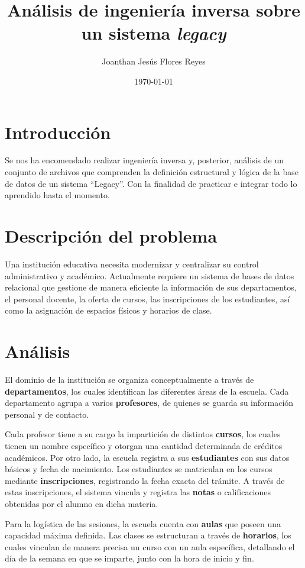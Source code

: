 \documentclass[12pt,letterpaper]{article}
\author{Joanthan Jesús Flores Reyes}
\title{Análisis de ingeniería inversa sobre un sistema \textit{legacy}}
\date{\today}
\begin{document}
\maketitle
\tableofcontents
\listoffigures
\listoftables
\lstlistoflistings

\vspace{1cm}

\section{Introducción}
Se nos ha encomendado realizar ingeniería inversa y, posterior, análisis de un conjunto de archivos que comprenden la definición estructural y lógica de la base de datos de un sistema ``Legacy''. Con la finalidad de practicar e integrar todo lo aprendido hasta el momento.

\section{Descripción del problema}
Una institución educativa necesita modernizar y centralizar su control administrativo y académico. Actualmente requiere un sistema de bases de datos relacional que gestione de manera eficiente la información de sus departamentos, el personal docente, la oferta de cursos, las inscripciones de los estudiantes, así como la asignación de espacios físicos y horarios de clase.

\section{Análisis}
El dominio de la institución se organiza conceptualmente a través de \textbf{departamentos}, los cuales identifican las diferentes áreas de la escuela. Cada departamento agrupa a varios \textbf{profesores}, de quienes se guarda su información personal y de contacto. 

Cada profesor tiene a su cargo la impartición de distintos \textbf{cursos}, los cuales tienen un nombre específico y otorgan una cantidad determinada de créditos académicos. Por otro lado, la escuela registra a sus \textbf{estudiantes} con sus datos básicos y fecha de nacimiento. Los estudiantes se matriculan en los cursos mediante \textbf{inscripciones}, registrando la fecha exacta del trámite. A través de estas inscripciones, el sistema vincula y registra las \textbf{notas} o calificaciones obtenidas por el alumno en dicha materia.

Para la logística de las sesiones, la escuela cuenta con \textbf{aulas} que poseen una capacidad máxima definida. Las clases se estructuran a través de \textbf{horarios}, los cuales vinculan de manera precisa un curso con un aula específica, detallando el día de la semana en que se imparte, junto con la hora de inicio y fin.
\end{document}
